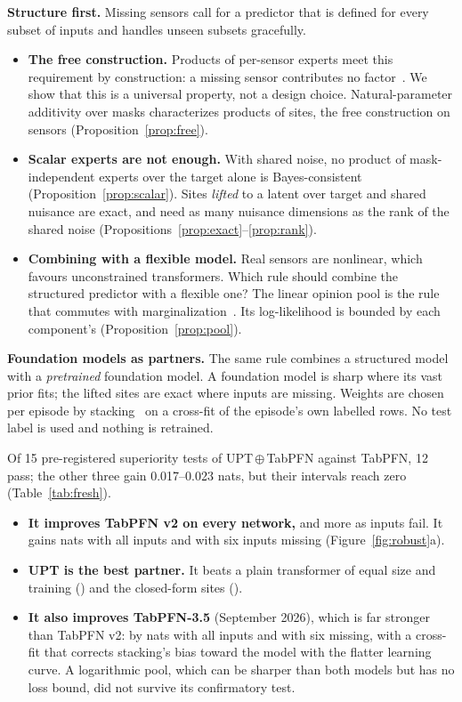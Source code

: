 \documentclass{article}
\begin{document}
\textbf{Structure first.} Missing sensors call for a predictor that is defined for every subset of inputs and handles
unseen subsets gracefully.
\begin{itemize}
  \item \textbf{The free construction.} Products of per-sensor experts meet this requirement by construction: a
  missing sensor contributes no factor~\citep{hinton2002poe,wu2018mvae}. We show that this is a universal property,
  not a design choice. Natural-parameter additivity over masks characterizes products of sites, the free
  construction on sensors (Proposition~\ref{prop:free}).
  \item \textbf{Scalar experts are not enough.} With shared noise, no product of mask-independent experts over the
  target alone is Bayes-consistent (Proposition~\ref{prop:scalar}). Sites \emph{lifted} to a latent over target and
  shared nuisance are exact, and need as many nuisance dimensions as the rank of the shared noise
  (Propositions~\ref{prop:exact}--\ref{prop:rank}).
  \item \textbf{Combining with a flexible model.} Real sensors are nonlinear, which favours unconstrained
  transformers. Which rule should combine the structured predictor with a flexible one? The linear opinion pool is
  the rule that commutes with marginalization~\citep{mcconway1981marginalization}. Its log-likelihood is bounded by
  each component's (Proposition~\ref{prop:pool}).
\end{itemize}

\textbf{Foundation models as partners.} The same rule combines a structured model with a \emph{pretrained}
foundation model. A foundation model is sharp where its vast prior fits; the lifted sites are exact where inputs are
missing. Weights are chosen per episode by stacking~\citep{yao2018stacking} on a cross-fit of the episode's own
labelled rows. No test label is used and nothing is retrained.

Of 15 pre-registered superiority tests of UPT\,$\oplus$\,TabPFN against TabPFN, 12 pass; the other three gain
0.017--0.023 nats, but their intervals reach zero (Table~\ref{tab:fresh}).
\begin{itemize}
  \item \textbf{It improves TabPFN v2 on every network,} and more as inputs fail. It gains \XOne{} nats with all
  inputs and \XTwoSix{} with six inputs missing (Figure~\ref{fig:robust}a).
  \item \textbf{UPT is the best partner.} It beats a plain transformer of equal size and training (\YOneZero{}) and
  the closed-form sites (\YTwoZero{}).
  \item \textbf{It also improves TabPFN-3.5} (September 2026), which is far stronger than TabPFN v2: by \VOne{} nats
  with all inputs and \VTwoSix{} with six missing, with a cross-fit that corrects stacking's bias toward the model with
  the flatter learning curve. A logarithmic pool, which can be sharper than both models but has no loss bound, did not
  survive its confirmatory test.
\end{itemize}
\end{document}
